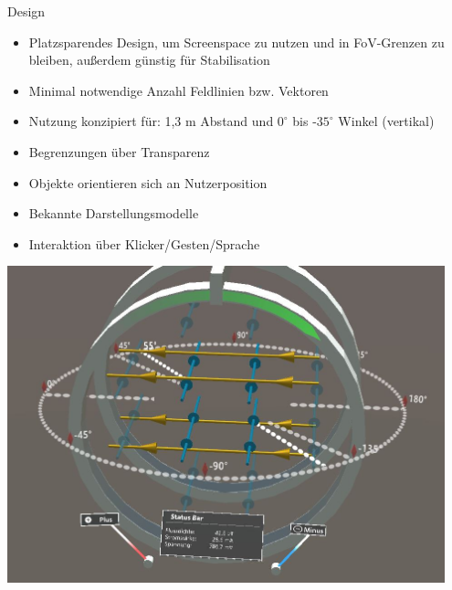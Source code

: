 \begin{frame}[fragile]{Design}
\vspace{-10px}
\begin{minipage}[t]{\textwidth}
	{
		\begin{itemize}[itemsep=1mm]
			\item Platzsparendes Design, um Screenspace zu nutzen und in FoV-Grenzen zu bleiben, außerdem günstig für Stabilisation
			\item Minimal notwendige Anzahl Feldlinien bzw. Vektoren
			\item Nutzung konzipiert für: 1,3 m Abstand und $0^\circ$ bis -$35^\circ$ Winkel (vertikal)
		\end{itemize}
	}
\end{minipage}


\begin{minipage}{0.6\textwidth}
	{
	\begin{itemize}[itemsep=1mm]
		\item Begrenzungen über Transparenz
		\item Objekte orientieren sich an Nutzerposition
		\item Bekannte Darstellungsmodelle
		\item Interaktion über Klicker/Gesten/Sprache
	\end{itemize}
	}
\end{minipage}
\begin{minipage}{0.35\textwidth}
	\centering
	\includegraphics[width=0.95\textwidth]{images/unity/overview.jpg}\\
\end{minipage}
\end{frame}

